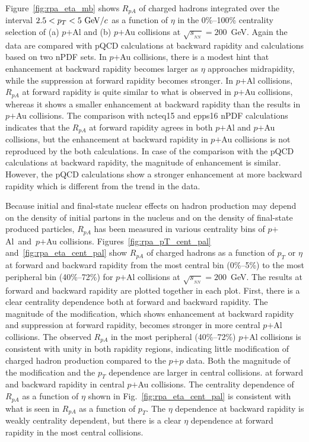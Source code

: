 \documentclass[twocolumn,letterpaper,aps,prc,longbibliography,superscriptaddress,nofootinbib,floatfix]{revtex4-2}
\newcommand{\pt}{\mbox{$p_T$}\xspace}
\newcommand{\rpa}{\mbox{$R_{pA}$}\xspace}
\newcommand{\sqsntwo}{\mbox{$\sqrt{s_{_{NN}}}=200$~GeV}\xspace}
\newcommand{\pp}{\mbox{$p$+$p$}\xspace}
\newcommand{\pau}{\mbox{$p$$+$Au}\xspace}
\newcommand{\pal}{\mbox{$p$$+$Al}\xspace}
\newcommand{\palau}{\mbox{$p$$+$Al and $p$$+$Au}\xspace}
\newcommand{\ncteq}{\mbox{n{\sc cteq15}}\xspace}
\newcommand{\epps}{\mbox{{\sc epps16}}\xspace}
\begin{document}
Figure~\ref{fig:rpa_eta_mb} shows \rpa of charged hadrons integrated 
over the interval $2.5<\pt<5~{\rm GeV}/c$ as a function of $\eta$ in the 
0\%--100\% centrality selection of (a) \pal and (b) \pau  
collisions at \sqsntwo.  Again the data are compared with pQCD 
calculations at backward rapidity and calculations based on two nPDF 
sets. In \pau collisions, there is a modest hint that enhancement at 
backward rapidity becomes larger as $\eta$ approaches midrapidity, 
while the suppression at forward rapidity becomes stronger. In \pal 
collisions, \rpa at forward rapidity is quite similar to what is 
observed in \pau collisions, whereas it shows a smaller enhancement at 
backward rapidity than the results in \pau collisions. The comparison 
with \ncteq and \epps nPDF calculations indicates that the \rpa at 
forward rapidity agrees in both \pal and \pau collisions, but the 
enhancement at backward rapidity in \pau collisions is not reproduced by 
the both calculations. In case of the comparison with the pQCD 
calculations at backward rapidity, the magnitude of enhancement is 
similar. However, the pQCD calculations show a stronger enhancement at 
more backward rapidity which is different from the trend in the data.

Because initial and final-state nuclear effects on hadron production may 
depend on the density of initial partons in the nucleus and on the 
density of final-state produced particles, \rpa has been measured in 
various centrality bins of \palau collisions. 
Figures~\ref{fig:rpa_pT_cent_pal} and~\ref{fig:rpa_eta_cent_pal} show 
\rpa of charged hadrons as a function of \pt or $\eta$ at forward and 
backward rapidity from the most central bin (0\%--5\%) to the most 
peripheral bin (40\%--72\%) for \pal collisions at \sqsntwo.  The 
results at forward and backward rapidity are plotted together in each 
plot.  First, there is a clear centrality dependence both at forward and 
backward rapidity. The magnitude of the modification, which shows 
enhancement at backward rapidity and suppression at forward rapidity, 
becomes stronger in more central \pal collisions. The observed \rpa in 
the most peripheral (40\%--72\%) \pal collisions is consistent with 
unity in both rapidity regions, indicating little modification of 
charged hadron production compared to the \pp data. Both the magnitude 
of the modification and the \pt dependence are larger in central 
collisions. %
at forward and backward rapidity in central \pau collisions. The 
centrality dependence of \rpa as a function of $\eta$ shown in 
Fig.~\ref{fig:rpa_eta_cent_pal} is consistent with what is seen in \rpa 
as a function of \pt. The $\eta$ dependence at backward rapidity is 
weakly centrality dependent, but there is a clear $\eta$ dependence at 
forward rapidity in the most central collisions.
\end{document}
